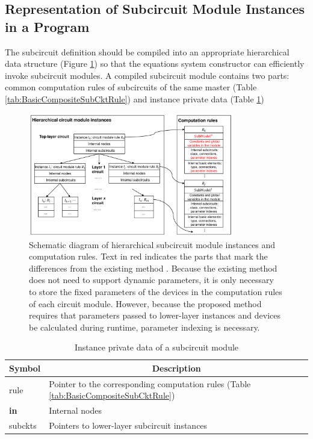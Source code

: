 \subsection{Representation of Subcircuit Module Instances in a Program}
\label{subsec:subckt-instance-data-structure}
The subcircuit definition should be compiled into an appropriate hierarchical data structure (Figure \ref{fig:subckt-instance-data-structure}) so that the equations system constructor can efficiently invoke subcircuit modules. A compiled subcircuit module contains two parts: common computation rules of subcircuits of the same master (Table \ref{tab:BasicCompositeSubCktRule}) and instance private data (Table \ref{tab:CompositeSubCkt})
\begin{figure}[htpb]
\centering
\includegraphics[width=0.8\textwidth]{fig/subckt-instance-data-structure.pdf}
\caption{Schematic diagram of hierarchical subcircuit module instances and computation rules. {\color{red}Text in red} indicates the parts that mark the differences from the existing method \cite{tcherniaev2003transistor}.
  Because the existing method does not need to support dynamic parameters, it is only necessary to store the fixed parameters of the devices in the computation rules of each circuit module. However, because the proposed method requires that parameters passed to lower-layer instances and devices be calculated during runtime, parameter indexing is necessary.}
\label{fig:subckt-instance-data-structure}
\end{figure}
\begin{table}[htbp]
\centering
\caption{Instance private data of a subcircuit module}\label{tab:CompositeSubCkt}
\begin{tabular}{l|l}
	\hline
	\multicolumn{1}{c|}{Symbol} & \multicolumn{1}{c}{Description}\\
	\hline
	rule        & Pointer to the corresponding computation rules (Table \ref{tab:BasicCompositeSubCktRule}) \\
    \textbf{in} & Internal nodes \\
	subckts     & Pointers to lower-layer subcircuit instances \\
	\hline
\end{tabular}
\end{table}
